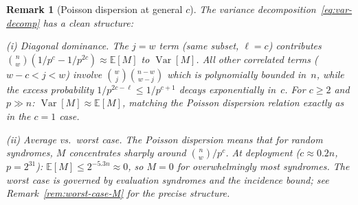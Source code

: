 \documentclass[11pt]{article}
\newtheorem{remark}[theorem]{Remark}
\newcommand{\EE}{\mathbb{E}}
\DeclareMathOperator{\Var}{Var}
\begin{document}
\begin{remark}[Poisson dispersion at general $c$]
\label{rem:poisson-c}
The variance decomposition~\eqref{eq:var-decomp} has a clean structure:

\noindent\emph{(i) Diagonal dominance.} The $j = w$ term (same subset, $\ell = c$) contributes $\binom{n}{w}(1/p^c - 1/p^{2c}) \approx \EE[M]$ to $\Var[M]$. All other correlated terms ($w - c < j < w$) involve $\binom{w}{j}\binom{n-w}{w-j}$ which is polynomially bounded in~$n$, while the excess probability $1/p^{2c-\ell} \leq 1/p^{c+1}$ decays exponentially in~$c$. For $c \geq 2$ and $p \gg n$: $\Var[M] \approx \EE[M]$, matching the Poisson dispersion relation exactly as in the $c = 1$ case.

\noindent\emph{(ii) Average vs.\ worst case.} The Poisson dispersion means that for \emph{random} syndromes, $M$ concentrates sharply around $\binom{n}{w}/p^c$. At deployment ($c \approx 0.2n$, $p = 2^{31}$): $\EE[M] \leq 2^{-5.3n} \approx 0$, so $M = 0$ for overwhelmingly most syndromes. The \emph{worst case} is governed by evaluation syndromes and the incidence bound; see Remark~\ref{rem:worst-case-M} for the precise structure.
\end{remark}
\end{document}
